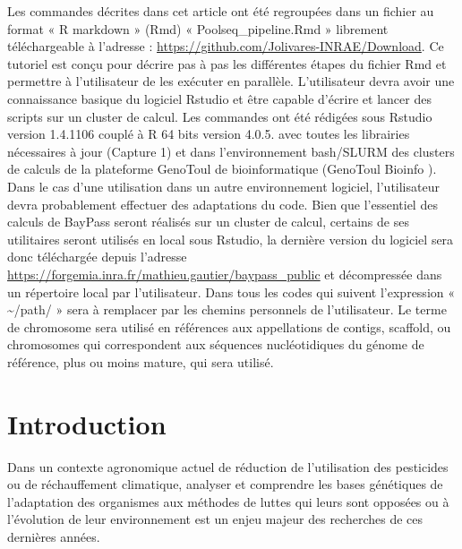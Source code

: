 \documentclass[
  openany]{book}
\theoremstyle{definition}
\theoremstyle{definition}
\theoremstyle{definition}
\theoremstyle{definition}
\theoremstyle{remark}
\begin{document}
Les commandes décrites dans cet article ont été regroupées dans un fichier au format « R markdown » (Rmd) « Poolseq\_pipeline.Rmd » librement téléchargeable à l'adresse : \url{https://github.com/Jolivares-INRAE/Download}. Ce tutoriel est conçu pour décrire pas à pas les différentes étapes du fichier Rmd et permettre à l'utilisateur de les exécuter en parallèle.
L'utilisateur devra avoir une connaissance basique du logiciel Rstudio et être capable d'écrire et lancer des scripts sur un cluster de calcul.
Les commandes ont été rédigées sous Rstudio version 1.4.1106 couplé à R 64 bits version 4.0.5. avec toutes les librairies nécessaires à jour (Capture 1) et dans l'environnement bash/SLURM des clusters de calculs de la plateforme GenoToul de bioinformatique (GenoToul Bioinfo ). Dans le cas d'une utilisation dans un autre environnement logiciel, l'utilisateur devra probablement effectuer des adaptations du code.
Bien que l'essentiel des calculs de BayPass seront réalisés sur un cluster de calcul, certains de ses utilitaires seront utilisés en local sous Rstudio, la dernière version du logiciel sera donc téléchargée depuis l'adresse \url{https://forgemia.inra.fr/mathieu.gautier/baypass_public} et décompressée dans un répertoire local par l'utilisateur.
Dans tous les codes qui suivent l'expression « \textasciitilde/path/ » sera à remplacer par les chemins personnels de l'utilisateur.
Le terme de chromosome sera utilisé en références aux appellations de contigs, scaffold, ou chromosomes qui correspondent aux séquences nucléotidiques du génome de référence, plus ou moins mature, qui sera utilisé.

\hypertarget{introduction}{%
\chapter*{Introduction}\label{introduction}}

Dans un contexte agronomique actuel de réduction de l'utilisation des pesticides ou de réchauffement climatique, analyser et comprendre les bases génétiques de l'adaptation des organismes aux méthodes de luttes qui leurs sont opposées ou à l'évolution de leur environnement est un enjeu majeur des recherches de ces dernières années.
\end{document}
